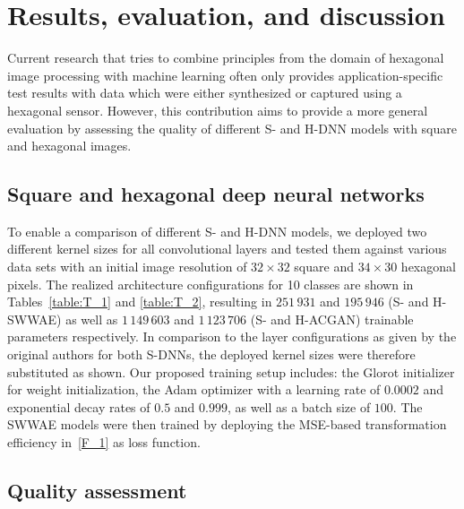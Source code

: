 \documentclass{article}
\begin{document}
\section{Results, evaluation, and discussion}

Current research that tries to combine principles from the domain of hexagonal image processing with machine learning often only provides application-specific test results with data which were either synthesized or captured using a hexagonal sensor. However, this contribution aims to provide a more general evaluation by assessing the quality of different S- and H-DNN models with square and hexagonal images.


\subsection{Square and hexagonal deep neural networks}

To enable a comparison of different S- and H-DNN models, we deployed two different kernel sizes for all convolutional layers and tested them against various data sets with an initial image resolution of $32 \times 32$ square and $34 \times 30$ hexagonal pixels. The realized architecture configurations for 10 classes are shown in Tables~\ref{table:T_1} and \ref{table:T_2}, resulting in $251\,931$ and $195\,946$ (S- and H-SWWAE) as well as $1\,149\,603$ and $1\,123\,706$ (S- and H-ACGAN) trainable parameters respectively. In comparison to the layer configurations as given by the original authors for both S-DNNs, the deployed kernel sizes were therefore substituted as shown. Our proposed training setup includes: the Glorot initializer for weight initialization, the Adam optimizer with a learning rate of $0.0002$ and exponential decay rates of $0.5$ and $0.999$, as well as a batch size of $100$. The SWWAE models were then trained by deploying the MSE-based transformation efficiency in~\eqref{F_1} as loss function.


\subsection{Quality assessment}
\end{document}

